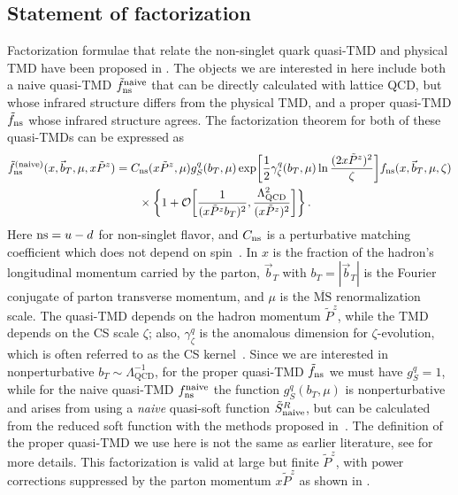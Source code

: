 \documentclass[11pt,a4paper]{article}
\newcommand{\MSbar}{{\overline{\mathrm{MS}}}}
\newcommand{\cO}{\mathcal{O}}
\newcommand{\nn}{\nonumber}
\newcommand{\LQCD}{\Lambda_\mathrm{QCD}}
\newcommand{\bt}{\vec b_T}
\newcommand{\ns}{{\rm ns}}
\begin{document}
\subsection{Statement of factorization}
\label{sec:statfac}

Factorization formulae that relate the non-singlet quark quasi-TMD and physical TMD
have been proposed in . 
The objects we are interested in here include both a naive quasi-TMD $\tilde f_{\ns}^{\rm naive}$ that can be directly calculated with lattice QCD, but whose infrared structure differs from the physical TMD, and a proper quasi-TMD $\tilde f_{\ns}$ whose infrared structure agrees.
The factorization theorem for both of these quasi-TMDs can be expressed as
\begin{align}\label{eq:oldfact}
	\tilde f^{\text{(naive)}}_\ns(x,\vec{b}_T,\mu,x \tilde P^z)
    &= C_\ns(x \tilde P^z, \mu) g_S^q(b_T,\mu)
    \exp\biggl[ {1\over 2}\gamma_\zeta^q(b_T,\mu) \ln{(2 x \tilde P^z)^2 \over \zeta}\biggr]
    f_{\ns} (x,\vec{b}_T,\mu,\zeta)
   \nn\\
	&\qquad \times\bigg\{ 1  + \cO\biggl[{1\over (x\tilde P^z b_T)^2}, {\Lambda_{\rm QCD}^2\over (x\tilde P^z)^2} \biggr] \bigg\} \,.
\end{align}
Here $\ns=u-d$ for non-singlet flavor, and $C_\ns$ is a perturbative matching coefficient which does not depend on spin~\cite{Ebert:2020gxr, Vladimirov:2020ofp}. 
In  $x$ is the fraction of the hadron's longitudinal momentum carried by the parton,
$\bt$ with $b_T=|\bt|$ is the Fourier conjugate of parton transverse momentum, and $\mu$ is the $\MSbar$ renormalization scale. The quasi-TMD depends on the hadron momentum $\tilde P^z$,
while the TMD depends on the CS scale $\zeta$; also, $\gamma_\zeta^q$ is the anomalous dimension for $\zeta$-evolution, which is often referred to as the CS kernel~\cite{Collins:1981uk,Collins:1981va,Collins:1984kg}.  
Since we are interested in nonperturbative $b_T \sim \LQCD^{-1}$, for the proper quasi-TMD $\tilde f_\ns$ we must have $g_S^q=1$, while for the naive quasi-TMD $f_\ns^{\rm naive}$ the function $g_S^q(b_T,\mu)$ is nonperturbative and arises from using a \textit{naive} quasi-soft function $\tilde S^R_{\rm naive}$, but can be calculated from the reduced soft function with the methods proposed in~.
The definition of the proper quasi-TMD we use here is not the same as earlier literature, see  for more details.
This factorization is valid at large but finite $\tilde P^z$, with power corrections suppressed by the parton momentum $x\tilde P^z$ as shown in .
\end{document}
